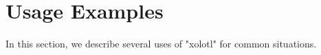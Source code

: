 \documentclass{frontiersSCNS} %
\newcommand{\eg}{\textit{e.g.}\xspace}
\begin{document}
%
%
%
%
%
%

\section{Usage Examples}
\label{usage}

In this section, we describe several uses of "xolotl" for common situations. 

%
%
%
%
%
%
\end{document}
